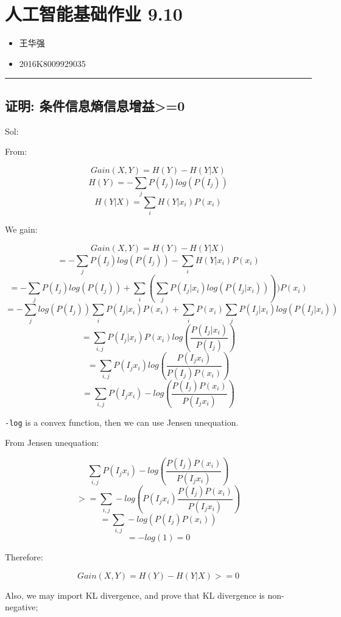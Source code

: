\hypertarget{ux4ebaux5de5ux667aux80fdux57faux7840ux4f5cux4e1a-9.10}{%
\section{人工智能基础作业
9.10}\label{ux4ebaux5de5ux667aux80fdux57faux7840ux4f5cux4e1a-9.10}}

\begin{itemize}
\tightlist
\item
  王华强
\item
  2016K8009929035
\end{itemize}

\begin{center}\rule{0.5\linewidth}{\linethickness}\end{center}

\hypertarget{ux8bc1ux660e-ux6761ux4ef6ux4fe1ux606fux71b5ux4fe1ux606fux589eux76ca0}{%
\subsection{证明:
条件信息熵信息增益\textgreater{}=0}\label{ux8bc1ux660e-ux6761ux4ef6ux4fe1ux606fux71b5ux4fe1ux606fux589eux76ca0}}

Sol:

From:

\[Gain(X,Y)=H(Y)-H(Y|X)\] \[H(Y)=-\sum_{j}^{}P(I_j)log(P(I_j))\]
\[H(Y|X)=\sum_{i}H(Y|x_i)P(x_i)\]

We gain:

\[Gain(X,Y)=H(Y)-H(Y|X)\]
\[=-\sum_{j}^{}P(I_j)log(P(I_j))-\sum_{i}H(Y|x_i)P(x_i)\]
\[=-\sum_{j}^{}P(I_j)log(P(I_j))+\sum_{i}(\sum_{j}^{}P(I_j|x_i)log(P(I_j|x_i))))P(x_i)\]
\[=-\sum_{j}^{}log(P(I_j))\sum_{i}P(I_j|x_i)P(x_i)+\sum_{i}P(x_i)\sum_{j}^{}P(I_j|x_i)log(P(I_j|x_i))\]
\[=\sum_{i,j}P(I_j|x_i)P(x_i)log(\frac{P(I_j|x_i)}{P(I_j)})\]
\[=\sum_{i,j}P(I_jx_i)log(\frac{P(I_jx_i)}{P(I_j)P(x_i)})\]
\[=\sum_{i,j}P(I_jx_i)-log(\frac{P(I_j)P(x_i)}{P(I_jx_i)})\]

\texttt{-log} is a convex function, then we can use Jensen unequation.

From Jensen unequation:

\[\sum_{i,j}P(I_jx_i)-log(\frac{P(I_j)P(x_i)}{P(I_jx_i)})\]
\[>=\sum_{i,j}-log(P(I_jx_i)\frac{P(I_j)P(x_i)}{P(I_jx_i)})\]
\[=\sum_{i,j}-log(P(I_j)P(x_i))\] \[=-log(1)=0\]

Therefore:

\[Gain(X,Y)=H(Y)-H(Y|X)>=0\]

Also, we may import KL divergence, and prove that KL divergence is
non-negative;

